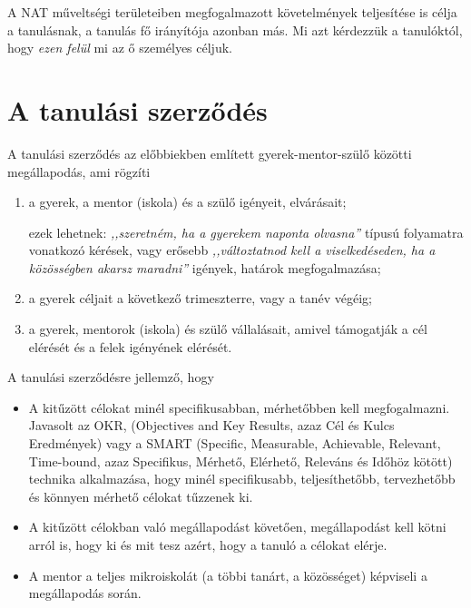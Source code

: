 A NAT műveltségi területeiben megfogalmazott követelmények teljesítése is célja
a tanulásnak, a tanulás fő irányítója azonban más. Mi azt kérdezzük a
tanulóktól, hogy \emph{ezen felül} mi az ő személyes céljuk.

\section{A tanulási szerződés}

A tanulási szerződés az előbbiekben említett gyerek-mentor-szülő közötti
megállapodás, ami rögzíti
\begin{enumerate}
  \item a gyerek, a mentor (iskola) és a szülő igényeit, elvárásait;

        ezek lehetnek: \emph{,,szeretném, ha a gyerekem naponta olvasna''} típusú
        folyamatra vonatkozó kérések, vagy erősebb \emph{,,változtatnod kell a
          viselkedéseden, ha a közösségben akarsz maradni''} igények, határok
        megfogalmazása;

  \item a gyerek céljait a következő trimeszterre, vagy a tanév végéig;

  \item a gyerek, mentorok (iskola) és szülő vállalásait, amivel támogatják a cél
        elérését és a felek igényének elérését.

\end{enumerate}

A tanulási szerződésre jellemző, hogy
\begin{itemize}
  \item A kitűzött célokat minél specifikusabban, mérhetőbben kell megfogalmazni.
        Javasolt az OKR,  (Objectives and Key Results, azaz  Cél és Kulcs Eredmények)
        \citep{okr} vagy a SMART (Specific, Measurable, Achievable, Relevant,
        Time-bound, azaz Specifikus,  Mérhető, Elérhető, Releváns és Időhöz kötött)
        \citep{wiki:smart} technika alkalmazása, hogy minél specifikusabb,
        teljesíthetőbb, tervezhetőbb és könnyen mérhető célokat tűzzenek ki.

  \item A kitűzött célokban való megállapodást követően, megállapodást  kell
        kötni arról is, hogy ki és mit tesz azért, hogy a tanuló a célokat elérje.

  \item A mentor a teljes mikroiskolát (a többi tanárt, a közösséget) képviseli a
        megállapodás során.
\end{itemize}

